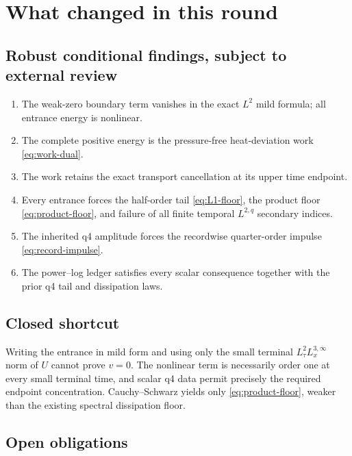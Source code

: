\documentclass[11pt]{article}
\theoremstyle{remark}
\begin{document}
\section{What changed in this round}

\subsection*{Robust conditional findings, subject to external review}

\begin{enumerate}
 \item The weak-zero boundary term vanishes in the exact \(L^2\) mild
 formula; all entrance energy is nonlinear.
 \item The complete positive energy is the pressure-free
 heat-deviation work \eqref{eq:work-dual}.
 \item The work retains the exact transport cancellation at its upper
 time endpoint.
 \item Every entrance forces the half-order tail
 \eqref{eq:L1-floor}, the product floor
 \eqref{eq:product-floor}, and failure of all finite temporal
 \(L^{2,q}\) secondary indices.
 \item The inherited q4 amplitude forces the recordwise quarter-order
 impulse \eqref{eq:record-impulse}.
 \item The power--log ledger satisfies every scalar consequence together
 with the prior q4 tail and dissipation laws.
\end{enumerate}

\subsection*{Closed shortcut}

Writing the entrance in mild form and using only the small terminal
\(L^2_\tau L^{3,\infty}_x\) norm of \(U\) cannot prove \(v=0\).  The
nonlinear term is necessarily order one at every small terminal time,
and scalar q4 data permit precisely the required endpoint
concentration.  Cauchy--Schwarz yields only
\eqref{eq:product-floor}, weaker than the existing spectral
dissipation floor.

\subsection*{Open obligations}
\end{document}

